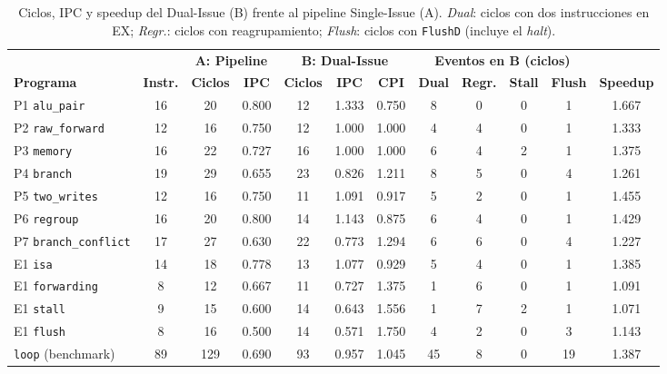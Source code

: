 \documentclass[12pt,a4paper]{article}
\begin{document}
\begin{landscape}
\begin{table}[p]
\centering
\small
\setlength{\tabcolsep}{4pt}
\begin{tabular}{@{}lccccccccccc@{}}
\toprule
 & & \multicolumn{2}{c}{\textbf{A: Pipeline}} & \multicolumn{3}{c}{\textbf{B: Dual-Issue}} & \multicolumn{4}{c}{\textbf{Eventos en B (ciclos)}} & \\
\cmidrule(lr){3-4} \cmidrule(lr){5-7} \cmidrule(lr){8-11}
\textbf{Programa} & \textbf{Instr.} & \textbf{Ciclos} & \textbf{IPC} & \textbf{Ciclos} & \textbf{IPC} & \textbf{CPI} & \textbf{Dual} & \textbf{Regr.} & \textbf{Stall} & \textbf{Flush} & \textbf{Speedup} \\
\midrule
P1 \texttt{alu\_pair}        & 16 & 20 & 0.800 & 12 & 1.333 & 0.750 &  8 & 0 & 0 & 1 & 1.667 \\
P2 \texttt{raw\_forward}     & 12 & 16 & 0.750 & 12 & 1.000 & 1.000 &  4 & 4 & 0 & 1 & 1.333 \\
P3 \texttt{memory}           & 16 & 22 & 0.727 & 16 & 1.000 & 1.000 &  6 & 4 & 2 & 1 & 1.375 \\
P4 \texttt{branch}           & 19 & 29 & 0.655 & 23 & 0.826 & 1.211 &  8 & 5 & 0 & 4 & 1.261 \\
P5 \texttt{two\_writes}      & 12 & 16 & 0.750 & 11 & 1.091 & 0.917 &  5 & 2 & 0 & 1 & 1.455 \\
P6 \texttt{regroup}          & 16 & 20 & 0.800 & 14 & 1.143 & 0.875 &  6 & 4 & 0 & 1 & 1.429 \\
P7 \texttt{branch\_conflict} & 17 & 27 & 0.630 & 22 & 0.773 & 1.294 &  6 & 6 & 0 & 4 & 1.227 \\
\midrule
E1 \texttt{isa}              & 14 & 18 & 0.778 & 13 & 1.077 & 0.929 &  5 & 4 & 0 & 1 & 1.385 \\
E1 \texttt{forwarding}       &  8 & 12 & 0.667 & 11 & 0.727 & 1.375 &  1 & 6 & 0 & 1 & 1.091 \\
E1 \texttt{stall}            &  9 & 15 & 0.600 & 14 & 0.643 & 1.556 &  1 & 7 & 2 & 1 & 1.071 \\
E1 \texttt{flush}            &  8 & 16 & 0.500 & 14 & 0.571 & 1.750 &  4 & 2 & 0 & 3 & 1.143 \\
\midrule
\texttt{loop} (benchmark)    & 89 & 129 & 0.690 & 93 & 0.957 & 1.045 & 45 & 8 & 0 & 19 & 1.387 \\
\bottomrule
\end{tabular}
\caption{Ciclos, IPC y speedup del Dual-Issue (B) frente al pipeline Single-Issue (A). \textit{Dual}: ciclos con dos instrucciones en EX; \textit{Regr.}: ciclos con reagrupamiento; \textit{Flush}: ciclos con \texttt{FlushD} (incluye el \textit{halt}).}
\label{tab:comp}
\end{table}
\end{landscape}
\end{document}

